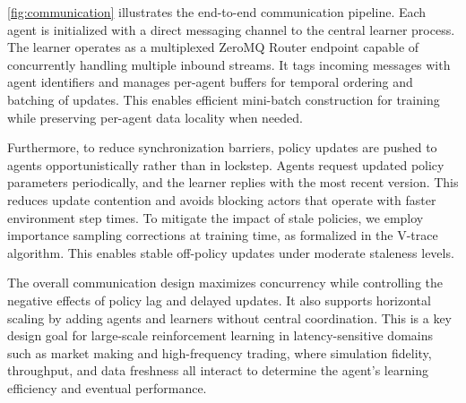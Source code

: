 \documentclass[11pt]{article}
\begin{document}
    \autoref{fig:communication} illustrates the end-to-end communication pipeline.
    Each agent is initialized with a direct messaging channel to the central learner process.
    The learner operates as a multiplexed ZeroMQ Router endpoint capable of concurrently handling multiple inbound streams.
    It tags incoming messages with agent identifiers and manages per-agent buffers for temporal ordering and batching of updates.
    This enables efficient mini-batch construction for training while preserving per-agent data locality when needed.

    Furthermore, to reduce synchronization barriers, policy updates are pushed to agents opportunistically rather than in lockstep.
    Agents request updated policy parameters periodically, and the learner replies with the most recent version.
    This reduces update contention and avoids blocking actors that operate with faster environment step times.
    To mitigate the impact of stale policies, we employ importance sampling corrections at training time, as formalized in the V-trace algorithm.
    This enables stable off-policy updates under moderate staleness levels.

    The overall communication design maximizes concurrency while controlling the negative effects of policy lag and delayed updates.
    It also supports horizontal scaling by adding agents and learners without central coordination.
    This is a key design goal for large-scale reinforcement learning in latency-sensitive domains such as market making and high-frequency trading,
    where simulation fidelity, throughput, and data freshness all interact to determine the agent’s learning efficiency and eventual performance.
\end{document}
